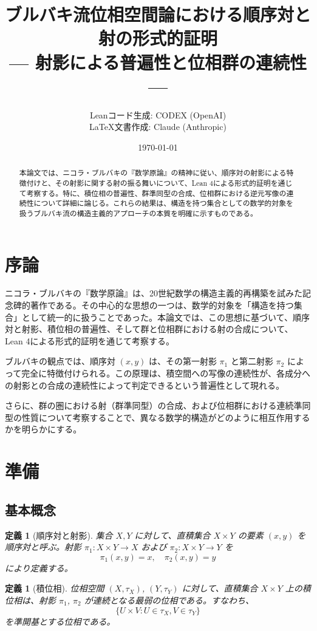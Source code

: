 \documentclass[uplatex, a4paper]{jlreq}
\title{ブルバキ流位相空間論における順序対と射の形式的証明\\
\large --- 射影による普遍性と位相群の連続性 ---}
\author{Leanコード生成: CODEX (OpenAI)\\LaTeX文書作成: Claude (Anthropic)}
\date{\today}
\newtheorem{definition}[theorem]{定義}
\begin{document}
\maketitle

\begin{abstract}
本論文では、ニコラ・ブルバキの『数学原論』の精神に従い、順序対の射影による特徴付けと、その射影に関する射の振る舞いについて、Lean 4による形式的証明を通じて考察する。特に、積位相の普遍性、群準同型の合成、位相群における逆元写像の連続性について詳細に論じる。これらの結果は、構造を持つ集合としての数学的対象を扱うブルバキ流の構造主義的アプローチの本質を明確に示すものである。
\end{abstract}

\section{序論}

ニコラ・ブルバキの『数学原論』は、20世紀数学の構造主義的再構築を試みた記念碑的著作である。その中心的な思想の一つは、数学的対象を「構造を持つ集合」として統一的に扱うことであった。本論文では、この思想に基づいて、順序対と射影、積位相の普遍性、そして群と位相群における射の合成について、Lean 4による形式的証明を通じて考察する。

ブルバキの観点では、順序対 $(x, y)$ は、その第一射影 $\pi_1$ と第二射影 $\pi_2$ によって完全に特徴付けられる。この原理は、積空間への写像の連続性が、各成分への射影との合成の連続性によって判定できるという普遍性として現れる。

さらに、群の圏における射（群準同型）の合成、および位相群における連続準同型の性質について考察することで、異なる数学的構造がどのように相互作用するかを明らかにする。

\section{準備}

\subsection{基本概念}

\begin{definition}[順序対と射影]
集合 $X, Y$ に対して、直積集合 $X \times Y$ の要素 $(x, y)$ を順序対と呼ぶ。射影 $\pi_1: X \times Y \to X$ および $\pi_2: X \times Y \to Y$ を
\[
\pi_1(x, y) = x, \quad \pi_2(x, y) = y
\]
により定義する。
\end{definition}

\begin{definition}[積位相]
位相空間 $(X, \tau_X)$, $(Y, \tau_Y)$ に対して、直積集合 $X \times Y$ 上の積位相は、射影 $\pi_1$, $\pi_2$ が連続となる最弱の位相である。すなわち、
\[
\{U \times V : U \in \tau_X, V \in \tau_Y\}
\]
を準開基とする位相である。
\end{definition}
\end{document}
